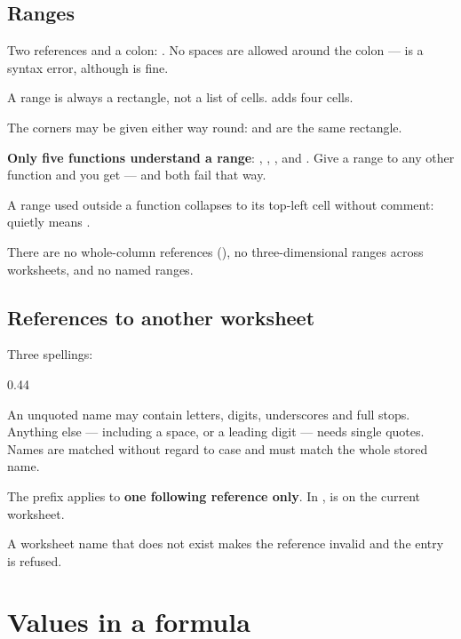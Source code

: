 \subsection{Ranges}

Two references and a colon: . No spaces are allowed around the
colon ---  is a syntax error, although  is fine.

A range is always a rectangle, not a list of cells.  adds four
cells.

The corners may be given either way round:  and
 are the same rectangle.

\begin{cccaution}
\textbf{Only five functions understand a range}: , ,
,  and . Give a range to any other function and you
get  ---  and  both fail
that way.

A range used outside a function collapses to its top-left cell without
comment:  quietly means .
\end{cccaution}

There are no whole-column references (), no three-dimensional ranges
across worksheets, and no named ranges.

\subsection{References to another worksheet}

Three spellings:

\begin{ccexamples}[]{0.44\linewidth}
\end{ccexamples}

An unquoted name may contain letters, digits, underscores and full stops.
Anything else --- including a space, or a leading digit --- needs single quotes.
Names are matched without regard to case and must match the whole stored name.

The prefix applies to \textbf{one following reference only}. In
,  is on the current worksheet.

A worksheet name that does not exist makes the reference invalid and the entry
is refused.

\section{Values in a formula}


